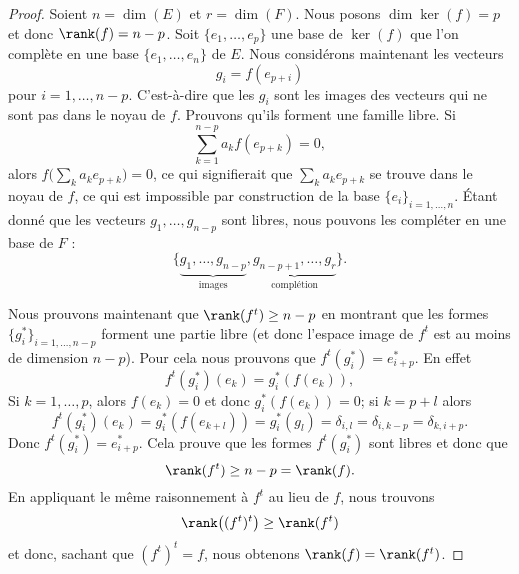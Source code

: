 \begin{proof}
	Soient \( n=\dim(E)\) et \( r=\dim(F)\).
	Nous posons \( \dim\ker(f)=p\) et donc \( \rank(f)=n-p\). Soit \( \{ e_1,\ldots, e_p \}\) une base de \( \ker(f)\) que l'on complète en une base \( \{ e_1,\ldots, e_n \}\) de \( E\). Nous considérons maintenant les vecteurs
	\begin{equation}
		g_i=f(e_{p+i})
	\end{equation}
	pour \( i=1,\ldots, n-p\). C'est-à-dire que les \( g_i\) sont les images des vecteurs qui ne sont pas dans le noyau de \( f\). Prouvons qu'ils forment une famille libre. Si
	\begin{equation}
		\sum_{k=1}^{n-p}a_kf(e_{p+k})=0,
	\end{equation}
	alors \( f\big( \sum_ka_ke_{p+k} \big)=0\), ce qui signifierait que \( \sum_ka_ke_{p+k}\) se trouve dans le noyau de \( f\), ce qui est impossible par construction de la base \( \{ e_i \}_{i=1,\ldots, n}\). Étant donné que les vecteurs \( g_1,\ldots, g_{n-p}\) sont libres, nous pouvons les compléter en une base de \( F\) :
	\begin{equation}
		\{ \underbrace{g_1,\ldots, g_{n-p}}_{\text{images}},\underbrace{g_{n-p+1},\ldots, g_r}_{\text{complétion}} \}.
	\end{equation}

	Nous prouvons maintenant que \( \rank(f^t)\geq n-p\) en montrant que les formes \( \{ g_i^* \}_{i=1,\ldots, n-p}\) forment une partie libre (et donc l'espace image de \( f^t\) est au moins de dimension \( n-p\)). Pour cela nous prouvons que \( f^t(g_i^*)=e^*_{i+p}\). En effet
	\begin{equation}
		f^t(g^*_i)(e_k)=g_i^*(f(e_k)),
	\end{equation}
	Si \( k=1,\ldots, p\), alors \( f(e_k)=0\) et donc \( g_i^*(f(e_k))=0\); si \( k=p+l\) alors
	\begin{equation}
		f^t(g_i^*)(e_k)=g_i^*(f(e_{k+l}))=g^*_i(g_l)=\delta_{i,l}=\delta_{i,k-p}=\delta_{k,i+p}.
	\end{equation}
	Donc \( f^t(g_i^*)=e^*_{i+p}\). Cela prouve que les formes \( f^t(g_i^*)\) sont libres et donc que
	\begin{equation}
		\rank(f^t)\geq n-p=\rank(f).
	\end{equation}
	En appliquant le même raisonnement à \( f^t\) au lieu de \( f\), nous trouvons
	\begin{equation}
		\rank\big( (f^t)^t \big)\geq \rank(f^t)
	\end{equation}
	et donc, sachant que \( (f^t)^t=f\), nous obtenons \( \rank(f)=\rank(f^t)\).

\end{proof}

